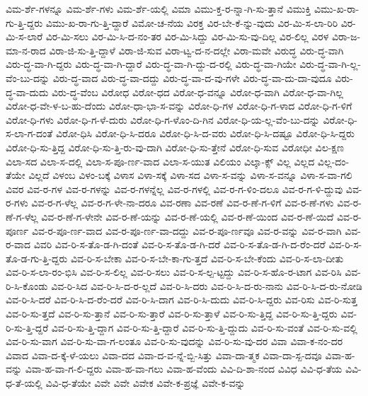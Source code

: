 {ವಿಮ-ರ್ಶೆ-ಗಳನ್ನೂ
ವಿಮ-ರ್ಶೆ-ಗಳು
ವಿಮ-ರ್ಶೆ-ಯಲ್ಲಿ
ವಿಮಾ
ವಿಮು-ಕ್ತ-ರ-ನ್ನಾ-ಗಿ-ಸು-ತ್ತಾನೆ
ವಿಮುಕ್ತಿ
ವಿಮು-ಖ-ರಾ-ಗು-ತ್ತಿ-ದ್ದರು
ವಿಮು-ಖ-ರಾ-ಗು-ತ್ತಿ-ದ್ದಾರೆ
ವಿಮೋ-ಚ-ನೆಯ
ವಿರಕ್ತ
ವಿರ-ಬೇ-ಕೆ-ನ್ನು-ವುದು
ವಿರ-ಮಿ-ಸ-ಲಾ-ರಿರಿ
ವಿರ-ಮಿ-ಸ-ಲಾರೆ
ವಿರ-ಮಿ-ಸಲು
ವಿರ-ಮಿ-ಸಿ-ದ-ನಂ-ತರ
ವಿರ-ಮಿ-ಸಿದ್ದು
ವಿರ-ಮಿ-ಸು-ವು-ದಿಲ್ಲ
ವಿರ-ಲಿಲ್ಲ
ವಿರಳ
ವಿರಾ-ಜ-ಮಾ-ನ-ರಾದ
ವಿರಾ-ಜಿ-ಸು-ತ್ತಿ-ದ್ದಾಳೆ
ವಿರಾ-ಜಿ-ಸುವ
ವಿರಾ-ಟ್ವ-ದ-ನ-ದಲ್ಲೇ
ವಿರಾ-ಮವೇ
ವಿರುದ್ಧ
ವಿರು-ದ್ಧ-ವಾಗಿ
ವಿರು-ದ್ಧ-ವಾ-ಗಿ-ದ್ದರು
ವಿರು-ದ್ಧ-ವಾ-ಗಿ-ದ್ದಾರೆ
ವಿರು-ದ್ಧ-ವಾ-ಗಿ-ದ್ದು-ದ-ರಲ್ಲಿ
ವಿರು-ದ್ಧ-ವಾ-ಗಿಯೇ
ವಿರು-ದ್ಧ-ವಾ-ಗಿ-ಲ್ಲ-ವೆಂ-ಬು-ದನ್ನು
ವಿರು-ದ್ಧ-ವಾದ
ವಿರು-ದ್ಧ-ವಾ-ದದ್ದು
ವಿರು-ದ್ಧ-ವಾ-ದ-ವು-ಗಳೇ
ವಿರು-ದ್ಧ-ವಾ-ದು-ದಾ-ವುದೂ
ವಿರು-ದ್ಧ-ವಾ-ದುದು
ವಿರು-ದ್ಧ-ವೆಂಬ
ವಿರೋಧ
ವಿರೋ-ಧದ
ವಿರೋ-ಧ-ವನ್ನೂ
ವಿರೋ-ಧ-ವಾಗಿ
ವಿರೋ-ಧ-ವಾ-ಗಿಲ್ಲ
ವಿರೋ-ಧ-ವೇ-ಳ-ಬ-ಹು-ದೆಂದು
ವಿರೋ-ಧಾ-ಭಾ-ಸ-ವನ್ನು
ವಿರೋ-ಧಿ-ಗಳ
ವಿರೋ-ಧಿ-ಗ-ಳಾದ
ವಿರೋ-ಧಿ-ಗ-ಳಿಗೆ
ವಿರೋ-ಧಿ-ಗಳು
ವಿರೋ-ಧಿ-ಗ-ಳೆ-ದುರು
ವಿರೋ-ಧಿ-ಗ-ಳೊಂ-ದಿ-ಗಿನ
ವಿರೋ-ಧಿ-ಯ-ಲ್ಲ-ವೆಂ-ಬು-ದನ್ನು
ವಿರೋ-ಧಿ-ಸ-ಲಾ-ಗ-ದಂತೆ
ವಿರೋ-ಧಿಸಿ
ವಿರೋ-ಧಿ-ಸಿ-ದರೂ
ವಿರೋ-ಧಿ-ಸಿ-ದ-ವರು
ವಿರೋ-ಧಿ-ಸಿ-ದಷ್ಟೂ
ವಿರೋ-ಧಿ-ಸಿ-ದ್ದರು
ವಿರೋ-ಧಿ-ಸು-ತ್ತಿದ್ದ
ವಿರೋ-ಧಿ-ಸು-ತ್ತಿ-ರು-ವು-ದಾಗಿ
ವಿರೋ-ಧಿ-ಸು-ತ್ತೇನೆ
ವಿರೋ-ಧಿ-ಸುವ
ವಿರೋಧೀ
ವಿಲ-ಕ್ಷಣ
ವಿಲಾ-ಸದ
ವಿಲಾ-ಸ-ದಲ್ಲಿ
ವಿಲಾ-ಸ-ಪೂ-ರ್ಣ-ವಾದ
ವಿಲಾ-ಸ-ಯುತ
ವಿಲಿಯಂ
ವಿಲ್ಕಾ-ಕ್ಸ್
ವಿಲ್ಲ
ವಿಲ್ಲದ
ವಿಲ್ಲ-ದಂ-ತೆಯೇ
ವಿಲ್ಲದೆ
ವಿಳಂಬ
ವಿಳಂ-ಬಕ್ಕೆ
ವಿಳಾಸ
ವಿಳಾ-ಸಕ್ಕೆ
ವಿಳಾ-ಸದ
ವಿಳಾ-ಸ-ವನ್ನು
ವಿಳಾ-ಸ-ವನ್ನೂ
ವಿಳಾ-ಸ-ವಾ-ಗಲಿ
ವಿವರ
ವಿವ-ರ-ಗಳ
ವಿವ-ರ-ಗಳನ್ನು
ವಿವ-ರ-ಗಳನ್ನೆಲ್ಲ
ವಿವ-ರ-ಗಳಲ್ಲಿ
ವಿವ-ರ-ಗ-ಳಿಂ-ದಲೂ
ವಿವ-ರ-ಗ-ಳಿ-ದ್ದುವು
ವಿವ-ರ-ಗಳು
ವಿವ-ರ-ಗ-ಳೆಲ್ಲ
ವಿವ-ರ-ಗ-ಳೇ-ನಾ-ದರೂ
ವಿವ-ರಣಾ
ವಿವ-ರಣೆ
ವಿವ-ರ-ಣೆ-ಗ-ಳಿಗೆ
ವಿವ-ರ-ಣೆ-ಗಳು
ವಿವ-ರ-ಣೆ-ಗ-ಳೆಲ್ಲ
ವಿವ-ರ-ಣೆ-ಗ-ಳೇನೇ
ವಿವ-ರ-ಣೆ-ಯನ್ನು
ವಿವ-ರ-ಣೆ-ಯಲ್ಲಿ
ವಿವ-ರ-ಣೆ-ಯಿಂದ
ವಿವ-ರ-ಣೆ-ಯಿದೆ
ವಿವ-ರ-ಪೂರ್ಣ
ವಿವ-ರ-ಪೂ-ರ್ಣ-ವಾದ
ವಿವ-ರ-ಪೂ-ರ್ಣ-ವಾ-ದದ್ದು
ವಿವ-ರ-ಪೂ-ರ್ಣವೂ
ವಿವ-ರ-ವನ್ನು
ವಿವ-ರ-ವಾಗಿ
ವಿವ-ರ-ವಾದ
ವಿವರಿ
ವಿವ-ರಿ-ಸ-ತೊ-ಡ-ಗಿ-ದಂತೆ
ವಿವ-ರಿ-ಸ-ತೊ-ಡ-ಗಿ-ದರೆ
ವಿವ-ರಿ-ಸ-ತೊ-ಡ-ಗಿ-ದ-ರೆಂ-ದರೆ
ವಿವ-ರಿ-ಸ-ತೊ-ಡ-ಗು-ತ್ತಿ-ದ್ದರು
ವಿವ-ರಿ-ಸ-ಬೇಕಾ
ವಿವ-ರಿ-ಸ-ಬೇ-ಕಾ-ಗು-ತ್ತದೆ
ವಿವ-ರಿ-ಸ-ಬೇ-ಕೆಂದು
ವಿವ-ರಿ-ಸ-ಲಾ-ದೀತು
ವಿವ-ರಿ-ಸ-ಲಾ-ರಂ-ಭಿಸಿ
ವಿವ-ರಿ-ಸ-ಲಿಲ್ಲ
ವಿವ-ರಿ-ಸಲು
ವಿವ-ರಿ-ಸ-ಲ್ಪ-ಟ್ಟದ್ದು
ವಿವ-ರಿ-ಸ-ಹೊ-ರ-ಟಾಗ
ವಿವ-ರಿಸಿ
ವಿವ-ರಿ-ಸಿ-ಕೊಂಡು
ವಿವ-ರಿ-ಸಿದ
ವಿವ-ರಿ-ಸಿ-ದ-ರ-ಲ್ಲದೆ
ವಿವ-ರಿ-ಸಿ-ದರು
ವಿವ-ರಿ-ಸಿ-ದ-ರು-ನಾನು
ವಿವ-ರಿ-ಸಿ-ದ-ರು-ನೋಡಿ
ವಿವ-ರಿ-ಸಿ-ದರೆ
ವಿವ-ರಿ-ಸಿ-ದ-ರೆಂ-ದರೆ
ವಿವ-ರಿ-ಸಿ-ದಾಗ
ವಿವ-ರಿ-ಸಿ-ದುದು
ವಿವ-ರಿ-ಸಿ-ದ್ದರು
ವಿವ-ರಿಸು
ವಿವ-ರಿ-ಸುತ್ತ
ವಿವ-ರಿ-ಸು-ತ್ತದೆ
ವಿವ-ರಿ-ಸು-ತ್ತಾನೆ
ವಿವ-ರಿ-ಸು-ತ್ತಾರೆ
ವಿವ-ರಿ-ಸು-ತ್ತಾಳೆ
ವಿವ-ರಿ-ಸು-ತ್ತಿದ್ದ
ವಿವ-ರಿ-ಸು-ತ್ತಿ-ದ್ದರು
ವಿವ-ರಿ-ಸು-ತ್ತಿ-ದ್ದರೆ
ವಿವ-ರಿ-ಸು-ತ್ತಿ-ದ್ದಾಗ
ವಿವ-ರಿ-ಸು-ತ್ತಿ-ದ್ದಾರೆ
ವಿವ-ರಿ-ಸು-ತ್ತಿ-ದ್ದುದು
ವಿವ-ರಿ-ಸು-ವಂತೆ
ವಿವ-ರಿ-ಸು-ವಲ್ಲಿ
ವಿವ-ರಿ-ಸು-ವಾಗ
ವಿವ-ರಿ-ಸು-ವಾ-ಗ-ಲಂತೂ
ವಿವ-ರಿ-ಸು-ವುದನ್ನು
ವಿವ-ರಿ-ಸು-ವು-ದರ
ವಿವಾ
ವಿವಾ-ಕ-ನಂ-ದರ
ವಿವಾದ
ವಿವಾ-ದ-ಕ್ಕೆ-ಳೆ-ಯಲು
ವಿವಾ-ದದ
ವಿವಾ-ದ-ವ-ನ್ನೆ-ಬ್ಬಿ-ಸಿತ್ತು
ವಿವಾ-ದಾ-ತ್ಮಕ
ವಿವಾ-ದಾ-ಸ್ಪ-ದವೂ
ವಿವಾ-ಹ-ವನ್ನು
ವಿವಾ-ಹ-ವಾ-ಗ-ಲಿ-ದ್ದರು
ವಿವಾ-ಹ-ವಾ-ಗಲು
ವಿವಾ-ಹ-ವೆಂದು
ವಿವಿ-ದಿ-ಶಾ-ನಂದ
ವಿವಿಧ
ವಿವಿ-ಧ-ತೆಯ
ವಿವಿ-ಧ-ತೆ-ಯಲ್ಲಿ
ವಿವಿ-ಧ-ತೆಯೇ
ವಿವೇ
ವಿವೇ
ವಿವೇಕ
ವಿವೇ-ಕ-ಪ್ರಜ್ಞೆ
ವಿವೇ-ಕ-ವನ್ನು
}
